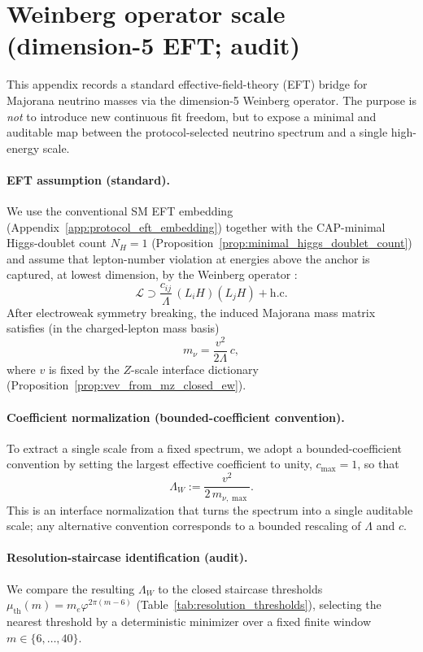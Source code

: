 \section{Weinberg operator scale (dimension-5 EFT; audit)}
\label{app:neutrino_weinberg_operator_closure}

This appendix records a standard effective-field-theory (EFT) bridge for Majorana neutrino masses via the dimension-5 Weinberg operator.
The purpose is \emph{not} to introduce new continuous fit freedom, but to expose a minimal and auditable map between the protocol-selected neutrino spectrum and a single high-energy scale.

\paragraph{EFT assumption (standard).}
\AuditTag We use the conventional SM EFT embedding (Appendix~\ref{app:protocol_eft_embedding}) together with the CAP-minimal Higgs-doublet count $N_H=1$ (Proposition~\ref{prop:minimal_higgs_doublet_count}) and assume that lepton-number violation at energies above the anchor is captured, at lowest dimension, by the Weinberg operator \cite{Weinberg1979WeinbergOperator}:
\[
\mathcal{L}\supset \frac{c_{ij}}{\Lambda}\,(L_iH)(L_jH)+\mathrm{h.c.}
\]
After electroweak symmetry breaking, the induced Majorana mass matrix satisfies (in the charged-lepton mass basis)
\[
m_\nu = \frac{v^2}{2\Lambda}\,c,
\]
where $v$ is fixed by the $Z$-scale interface dictionary (Proposition~\ref{prop:vev_from_mz_closed_ew}).

\paragraph{Coefficient normalization (bounded-coefficient convention).}
\AuditTag To extract a single scale from a fixed spectrum, we adopt a bounded-coefficient convention by setting the largest effective coefficient to unity, $c_{\max}=1$, so that
\[
\Lambda_W := \frac{v^2}{2\,m_{\nu,\max}}.
\]
This is an interface normalization that turns the spectrum into a single auditable scale; any alternative convention corresponds to a bounded rescaling of $\Lambda$ and $c$.

\paragraph{Resolution-staircase identification (audit).}
\AuditTag We compare the resulting $\Lambda_W$ to the closed staircase thresholds $\mu_{\mathrm{th}}(m)=m_e\varphi^{2\pi(m-6)}$ (Table~\ref{tab:resolution_thresholds}), selecting the nearest threshold by a deterministic minimizer over a fixed finite window $m\in\{6,\dots,40\}$.

